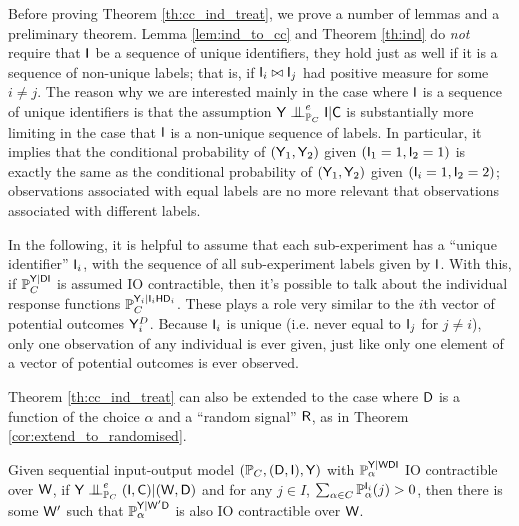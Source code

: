 Before proving Theorem \ref{th:cc_ind_treat}, we prove a number of lemmas and a preliminary theorem. Lemma \ref{lem:ind_to_cc} and Theorem \ref{th:ind} do \emph{not} require that $\mathsf{I}$ be a sequence of unique identifiers, they hold just as well if it is a sequence of non-unique labels; that is, if $\mathsf{I}_i\bowtie \mathsf{I}_j$ had positive measure for some $i\neq j$. The reason why we are interested mainly in the case where $\mathsf{I}$ is a sequence of unique identifiers is that the assumption $\RV{Y}\CI^e_{\prob{P}_C} \RV{I}|\RV{C}$ is substantially more limiting in the case that $\mathsf{I}$ is a non-unique sequence of labels. In particular, it implies that the conditional probability of $(\mathsf{Y}_1,\mathsf{Y}_2)$ given $(\mathsf{I}_1=1,\mathsf{I}_2=1)$ is exactly the same as the conditional probability of $(\mathsf{Y}_1,\mathsf{Y}_2)$ given $(\mathsf{I}_i=1,\mathsf{I}_2=2)$; observations associated with equal labels are no more relevant that observations associated with different labels.

In the following, it is helpful to assume that each sub-experiment has a ``unique identifier'' $\mathsf{I}_i$, with the sequence of all sub-experiment labels given by $\mathsf{I}$. With this, if $\mathbb{P}_C^{\mathsf{Y}|\mathsf{DI}}$ is assumed IO contractible, then it's possible to talk about the individual response functions $\mathbb{P}_C^{\mathsf{Y}_i|\mathsf{I}_i\mathsf{H}\mathsf{D}_i}$. These plays a role very similar to the $i$th vector of potential outcomes $\mathsf{Y}^D_i$. Because $\mathsf{I}_i$ is unique (i.e. never equal to $\mathsf{I}_j$ for $j\neq i$), only one observation of any individual is ever given, just like only one element of a vector of potential outcomes is ever observed.

Theorem \ref{th:cc_ind_treat} can also be extended to the case where $\mathsf{D}$ is a function of the choice $\alpha$ and a ``random signal'' $\mathsf{R}$, as in Theorem \ref{cor:extend_to_randomised}.

\begin{lemma}\label{lem:ind_to_cc}
Given sequential input-output model $(\mathbb{P}_C,(\mathsf{D},\mathsf{I}),\mathsf{Y})$ with $\mathbb{P}_\alpha^{\mathsf{Y}|\mathsf{WDI}}$ IO contractible over $\mathsf{W}$, if $\RV{Y}\CI_{\prob{P}_C}^e (\RV{I},\RV{C})|(\RV{W},\RV{D})$ and for any $j\in I$, $\sum_{\alpha\in C} \mathbb{P}_\alpha^{\mathsf{I}_i}(j)>0$, then there is some $\mathsf{W}'$ such that $\mathbb{P}_\alpha^{\mathsf{Y}|\mathsf{W}'\mathsf{D}}$ is also IO contractible over $\mathsf{W}$.
\end{lemma}

